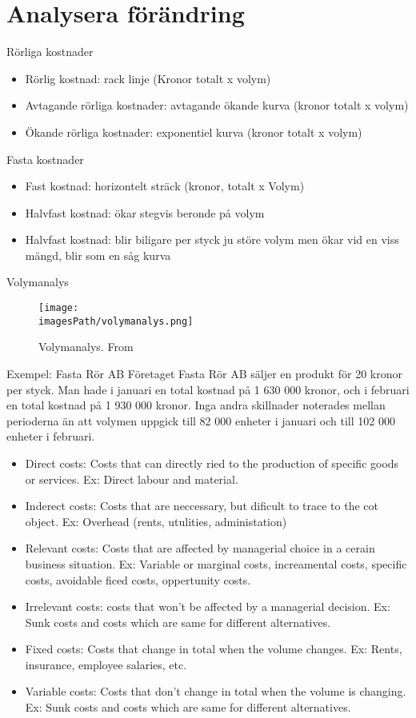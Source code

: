 \section{Analysera förändring}
Rörliga kostnader
\begin{itemize}
    \item Rörlig kostnad: rack linje (Kronor totalt x volym)
    \item Avtagande rörliga kostnader: avtagande ökande kurva (kronor totalt x volym)
    \item Ökande rörliga kostnader: exponentiel kurva (kronor totalt x volym)
\end{itemize}

Fasta kostnader 
\begin{itemize}
    \item Fast kostnad: horizontelt sträck (kronor, totalt x Volym)
    \item Halvfast kostnad: ökar stegvis beronde på volym
    \item Halvfast kostnad: blir biligare per styck ju störe volym men ökar vid en viss mängd, blir som en såg kurva
\end{itemize}

Volymanalys 
\begin{figure}[H]
    \centering
    \texttt{[image: \\imagesPath/volymanalys.png]}
    \caption{Volymanalys. From \cite{im}}
\end{figure}

\begin{exampleblock}{Exempel: Fasta Rör AB}
    Företaget Fasta Rör AB säljer en produkt för 20 kronor per styck. Man hade i januari en 
    total kostnad på 1 630 000 kronor, och i februari en total kostnad på 1 930 000 kronor. Inga 
    andra skillnader noterades mellan perioderna än att volymen uppgick till 82 000 enheter i januari 
    och till 102 000 enheter i februari.
\end{exampleblock}

\begin{itemize}
    \item Direct costs: Costs that can directly ried to the production of specific goods or services.
    Ex: Direct labour and material.
    \item Inderect costs: Costs that are neccessary, but dificult to trace to the cot object. 
    Ex: Overhead (rents, utulities, administation)
    \item Relevant costs: Costs that are affected by managerial choice in a cerain business situation.
    Ex: Variable or marginal costs, increamental costs, specific costs, avoidable ficed costs, oppertunity costs.
    \item Irrelevant costs: costs that won't be affected by a managerial decision.
    Ex: Sunk costs and costs which are same for different alternatives.
    \item Fixed costs: Costs that change in total when the volume changes.
    Ex: Rents, insurance, employee salaries, etc.
    \item Variable costs: Costs that don't change in total when the volume is changing.
    Ex: Sunk costs and costs which are same for different alternatives.
\end{itemize}

